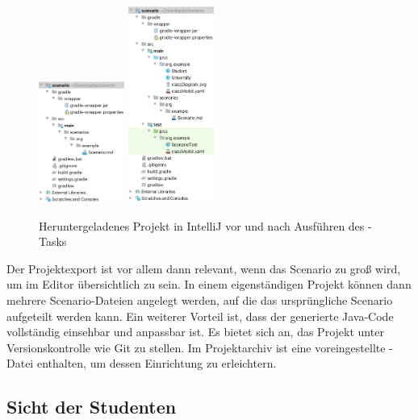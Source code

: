 \begin{figure}
    \centering
    \includegraphics[width=0.25\textwidth]{chapter/fulib.org/img/project-downloaded.png}
    \hspace{0.05\textwidth}
    \includegraphics[width=0.25\textwidth]{chapter/fulib.org/img/project-post-check.png}
    \caption{Heruntergeladenes Projekt in IntelliJ vor und nach Ausführen des -Tasks}
    \label{fig:project-downloaded}
\end{figure}

Der Projektexport ist vor allem dann relevant, wenn das Scenario zu groß wird, um im Editor übersichtlich zu sein.
In einem eigenständigen Projekt können dann mehrere Scenario-Dateien angelegt werden, auf die das ursprüngliche Scenario aufgeteilt werden kann.
Ein weiterer Vorteil ist, dass der generierte Java-Code vollständig einsehbar und anpassbar ist.
Es bietet sich an, das Projekt unter Versionskontrolle wie Git zu stellen.
Im Projektarchiv ist eine voreingestellte -Datei enthalten, um dessen Einrichtung zu erleichtern.

\subsection{Sicht der Studenten}\label{subsec:students-view}

